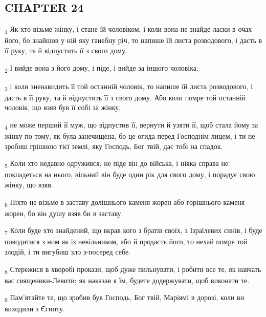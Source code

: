 \subsection{CHAPTER 24}
\begin{tcolorbox}
\textsubscript{1} Як хто візьме жінку, і стане їй чоловіком, і коли вона не знайде ласки в очах його, бо знайшов у ній яку ганебну річ, то напише їй листа розводового, і дасть в її руку, та й відпустить її з свого дому.
\end{tcolorbox}
\begin{tcolorbox}
\textsubscript{2} І вийде вона з його дому, і піде, і вийде за іншого чоловіка,
\end{tcolorbox}
\begin{tcolorbox}
\textsubscript{3} і коли зненавидить її той останній чоловік, то напише їй листа розводового, і дасть в її руку, та й відпустить її з свого дому. Або коли помре той останній чоловік, що взяв був її собі за жінку,
\end{tcolorbox}
\begin{tcolorbox}
\textsubscript{4} не може перший її муж, що відпустив її, вернути й узяти її, щоб стала йому за жінку по тому, як була занечищена, бо це огида перед Господнім лицем, і ти не зробиш грішною тієї землі, яку Господь, Бог твій, дає тобі на спадок.
\end{tcolorbox}
\begin{tcolorbox}
\textsubscript{5} Коли хто недавно одружився, не піде він до війська, і ніяка справа не покладеться на нього, вільний він буде один рік для свого дому, і порадує свою жінку, що взяв.
\end{tcolorbox}
\begin{tcolorbox}
\textsubscript{6} Ніхто не візьме в заставу долішнього каменя жорен або горішнього каменя жорен, бо він душу взяв би в заставу.
\end{tcolorbox}
\begin{tcolorbox}
\textsubscript{7} Коли буде хто знайдений, що вкрав кого з братів своїх, з Ізраїлевих синів, і буде поводитися з ним як із невільником, або й продасть його, то нехай помре той злодій, і ти вигубиш зло з-посеред себе.
\end{tcolorbox}
\begin{tcolorbox}
\textsubscript{8} Стережися в хворобі прокази, щоб дуже пильнувати, і робити все те, як навчать вас священики-Левити; як наказав я їм, будете додержувати, щоб виконати те.
\end{tcolorbox}
\begin{tcolorbox}
\textsubscript{9} Пам'ятайте те, що зробив був Господь, Бог твій, Маріямі в дорозі, коли ви виходили з Єгипту.
\end{tcolorbox}
